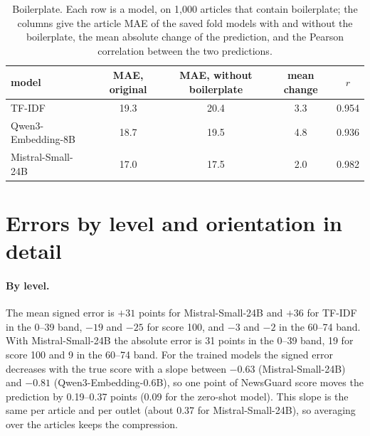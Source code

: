 \documentclass[11pt,a4paper]{article}
\begin{document}
\begin{table}[h]
\centering
\caption{Boilerplate. Each row is a model, on 1,000 articles that contain boilerplate; the columns give the article MAE
of the saved fold models with and without the boilerplate, the mean absolute change of the prediction, and the Pearson
correlation between the two predictions.}\label{tab:reading}
\begin{tabular}{lcccc}
\toprule
model & MAE, original & MAE, without boilerplate & mean change & $r$ \\
\midrule
TF-IDF & 19.3 & 20.4 & 3.3 & 0.954 \\
Qwen3-Embedding-8B & 18.7 & 19.5 & 4.8 & 0.936 \\
Mistral-Small-24B & 17.0 & 17.5 & 2.0 & 0.982 \\
\bottomrule
\end{tabular}
\end{table}

\section{Errors by level and orientation in detail}\label{app:errors}
\paragraph{By level.} The mean signed error is $+31$ points for Mistral-Small-24B and $+36$ for TF-IDF in the 0--39
band, $-19$ and $-25$ for score 100, and $-3$ and $-2$ in the 60--74 band. With Mistral-Small-24B the absolute error is
31 points in the 0--39 band, 19 for score 100 and 9 in the 60--74 band. For the trained models the signed error
decreases with the true score with a slope between $-0.63$ (Mistral-Small-24B) and $-0.81$ (Qwen3-Embedding-0.6B), so
one point of NewsGuard score moves the prediction by 0.19--0.37 points (0.09 for the zero-shot model). This slope is the
same per article and per outlet (about 0.37 for Mistral-Small-24B), so averaging over the articles keeps the
compression.
\end{document}
